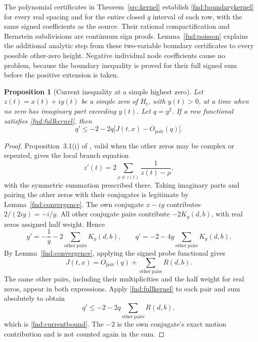 \documentclass[11pt,a4paper]{article}
\newtheorem{proposition}[theorem]{Proposition}
\theoremstyle{definition}
\theoremstyle{remark}
\begin{document}
The polynomial certificates in Theorem~\ref{src:kernel} establish
\eqref{fnd:boundarykernel} for every real spacing and for the entire closed
$q$ interval of each row, with the same signed coefficients as the
source. Their rational compactification and Bernstein subdivisions are
continuum sign proofs. Lemma~\ref{fnd:poisson} explains the additional
analytic step from these two-variable boundary certificates to every
possible other-zero height. Negative individual node coefficients cause
no problem, because the boundary inequality is proved for their full
signed sum before the positive extension is taken.

\begin{proposition}[Current inequality at a simple highest zero]
\label{fnd:current}
Let $z(t)=x(t)+iy(t)$ be a simple zero of $H_t$, with $y(t)>0$, at a time
when no zero has imaginary part exceeding $y(t)$. Let $q=y^2$. If a row
functional satisfies \eqref{fnd:fullkernel}, then
\begin{equation}
 q'\leq-2-2q\bigl[J(t,x)-O_{\mathrm{pair}}(q)\bigr].
 \label{fnd:currentbound}
\end{equation}
\end{proposition}
\begin{proof}
Proposition~3.1(i) of \cite{Polymath}, valid when the other zeros may be
complex or repeated, gives the local branch equation
\[
 z'(t)=2\sum_{\rho\ne z(t)}\frac1{z(t)-\rho},
\]
with the symmetric summation prescribed there. Taking imaginary parts
and pairing the other zeros with their conjugates is legitimate by
Lemma~\ref{fnd:convergence}. The own conjugate $x-iy$ contributes
$2/(2iy)=-i/y$. All other conjugate pairs contribute $-2K_y(d,b)$,
with real zeros assigned half weight. Hence
\begin{equation}
 y'=-\frac1y-2\sum_{\mathrm{other\ pairs}}K_y(d,b),\qquad
 q'=-2-4y\sum_{\mathrm{other\ pairs}}K_y(d,b).
 \label{fnd:motion}
\end{equation}
By Lemma~\ref{fnd:convergence}, applying the signed probe functional gives
\[
 J(t,x)=O_{\mathrm{pair}}(q)+\sum_{\mathrm{other\ pairs}}R(d,b).
\]
The same other pairs, including their multiplicities and the half weight
for real zeros, appear in both expressions. Apply \eqref{fnd:fullkernel}
to each pair and sum absolutely to obtain
\[
 q'\leq-2-2q\sum_{\mathrm{other\ pairs}}R(d,b),
\]
which is \eqref{fnd:currentbound}. The $-2$ is the own conjugate's exact
motion contribution and is not counted again in the sum.
\end{proof}
\end{document}
